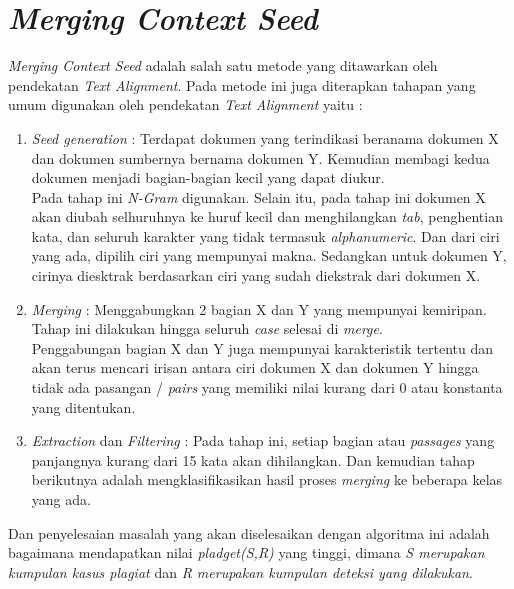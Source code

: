 \documentclass[../Proposal.tex]{subfiles}
\begin{document}
	\section{\textit{Merging Context Seed}}
	\textit{Merging Context Seed} adalah salah satu metode yang ditawarkan oleh pendekatan \textit{Text Alignment}. Pada metode ini juga diterapkan tahapan yang umum digunakan oleh pendekatan \textit{Text Alignment} yaitu\cite{mcs-paper,overview-textalignment-2013,overview6} :
	
	\begin{enumerate}
		\item \textit{Seed generation} : Terdapat dokumen yang terindikasi beranama dokumen X dan dokumen sumbernya bernama dokumen Y. Kemudian membagi kedua dokumen menjadi bagian-bagian kecil yang dapat diukur. \\
		Pada tahap ini \textit{N-Gram} digunakan. Selain itu, pada tahap ini dokumen X akan diubah selhuruhnya ke huruf kecil dan menghilangkan \textit{tab}, penghentian kata, dan seluruh karakter yang tidak termasuk \textit{alphanumeric}. Dan dari ciri yang ada, dipilih ciri yang mempunyai makna. Sedangkan untuk dokumen Y, cirinya diesktrak berdasarkan ciri yang sudah diekstrak dari dokumen X.
		
		\item \textit{Merging} : Menggabungkan 2 bagian X dan Y yang mempunyai kemiripan. Tahap ini dilakukan hingga seluruh \textit{case} selesai di \textit{merge}\cite{merge}. \\
		Penggabungan bagian X dan Y juga mempunyai karakteristik tertentu dan akan terus mencari irisan antara ciri dokumen X dan dokumen Y hingga tidak ada pasangan / \textit{pairs} yang memiliki nilai kurang dari 0 atau konstanta yang ditentukan.
		
		\item \textit{Extraction} dan \textit{Filtering} : Pada tahap ini, setiap bagian atau \textit{passages} yang panjangnya kurang dari 15 kata akan dihilangkan. Dan kemudian tahap berikutnya adalah mengklasifikasikan hasil proses \textit{merging} ke beberapa kelas yang ada.
	\end{enumerate}
	
	\noindent Dan penyelesaian masalah yang akan diselesaikan dengan algoritma ini adalah bagaimana mendapatkan nilai \textit{pladget(S,R)} yang tinggi, dimana \textit{S merupakan kumpulan kasus plagiat} dan \textit{R merupakan kumpulan deteksi yang dilakukan}.
\end{document}
